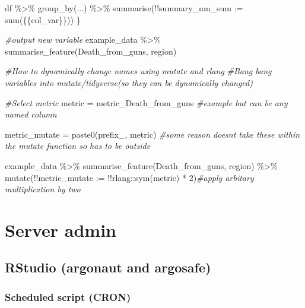 \documentclass[
]{book}
\newenvironment{Shaded}{\begin{snugshade}}{\end{snugshade}}
\newcommand{\AttributeTok}[1]{\textcolor[rgb]{0.77,0.63,0.00}{#1}}
\newcommand{\CommentTok}[1]{\textcolor[rgb]{0.56,0.35,0.01}{\textit{#1}}}
\newcommand{\DecValTok}[1]{\textcolor[rgb]{0.00,0.00,0.81}{#1}}
\newcommand{\FunctionTok}[1]{\textcolor[rgb]{0.00,0.00,0.00}{#1}}
\newcommand{\NormalTok}[1]{#1}
\newcommand{\OtherTok}[1]{\textcolor[rgb]{0.56,0.35,0.01}{#1}}
\newcommand{\SpecialCharTok}[1]{\textcolor[rgb]{0.00,0.00,0.00}{#1}}
\newcommand{\StringTok}[1]{\textcolor[rgb]{0.31,0.60,0.02}{#1}}
\begin{document}
\begin{Shaded}
\begin{Highlighting}[]
\NormalTok{  df }\SpecialCharTok{\%\textgreater{}\%}
    \FunctionTok{group\_by}\NormalTok{(...) }\SpecialCharTok{\%\textgreater{}\%} 
    \FunctionTok{summarise}\NormalTok{(}\SpecialCharTok{!!}\AttributeTok{summary\_nm\_sum :=} \FunctionTok{sum}\NormalTok{(\{\{col\_var\}\}))}
\NormalTok{\}}


\CommentTok{\#output new variable}
\NormalTok{example\_data }\SpecialCharTok{\%\textgreater{}\%} 
  \FunctionTok{summarise\_feature}\NormalTok{(Death\_from\_guns, region) }

\CommentTok{\#How to dynamically change names using mutate and rlang}
\CommentTok{\#Bang bang variables into mutate/tidyverse(so they can be dynamically changed)}

\CommentTok{\#Select metric}
\NormalTok{metric }\OtherTok{=} \StringTok{\textquotesingle{}metric\_Death\_from\_guns\textquotesingle{}} \CommentTok{\#example but can be any named column}

\NormalTok{metric\_mutate }\OtherTok{=} \FunctionTok{paste0}\NormalTok{(}\StringTok{\textquotesingle{}prefix\_\textquotesingle{}}\NormalTok{, metric) }\CommentTok{\#some reason doesn\textquotesingle{}t take these within the mutate function so has to be outside}

\NormalTok{example\_data }\SpecialCharTok{\%\textgreater{}\%} 
  \FunctionTok{summarise\_feature}\NormalTok{(Death\_from\_guns, region) }\SpecialCharTok{\%\textgreater{}\%} 
  \FunctionTok{mutate}\NormalTok{(}\SpecialCharTok{!!}\AttributeTok{metric\_mutate :=} \SpecialCharTok{!!}\NormalTok{rlang}\SpecialCharTok{::}\FunctionTok{sym}\NormalTok{(metric) }\SpecialCharTok{*} \DecValTok{2}\NormalTok{)}\CommentTok{\#apply arbitary multiplication by two}
\end{Highlighting}
\end{Shaded}

\hypertarget{server-admin}{%
\chapter{Server admin}\label{server-admin}}

\hypertarget{rstudio-argonaut-and-argosafe}{%
\section{RStudio (argonaut and argosafe)}\label{rstudio-argonaut-and-argosafe}}

\hypertarget{scheduled-script-cron}{%
\subsection{Scheduled script (CRON)}\label{scheduled-script-cron}}
\end{document}
